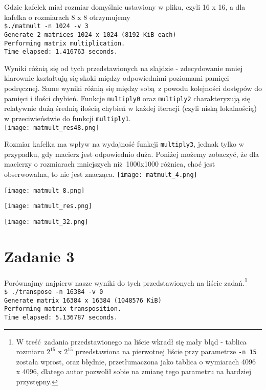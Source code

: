 \documentclass[10pt,wide]{mwart}
\begin{document}
Gdzie kafelek miał rozmiar domyślnie ustawiony w pliku, czyli 16 x 16, a dla kafelka o rozmiarach 8 x 8 otrzymujemy \\
\texttt{\$./matmult -n 1024 -v 3 \\
Generate 2 matrices 1024 x 1024 (8192 KiB each) \\
Performing matrix multiplication. \\
Time elapsed: 1.416763 seconds.\\}


  Wyniki różnią się od tych przedstawionych na slajdzie - zdecydowanie mniej klarownie kształtują się skoki między odpowiednimi poziomami pamięci podręcznej.
  Same wyniki różnią się między sobą z powodu kolejności dostępów do pamięci i ilości chybień.
  Funkcje \texttt{multiply0} oraz \texttt{multiply2} charakteryzują się relatywnie dużą średnią ilością chybień w każdej iteracji (czyli niską lokalnością) w przeciwieństwie do funkcji \texttt{multiply1}. \\
 \texttt{[image: matmult\_res48.png]}

 Rozmiar kafelka ma wpływ na wydajność funkcji \texttt{multiply3}, jednak tylko w przypadku, gdy macierz jest odpowiednio duża.
 Poniżej możemy zobaczyć, że dla macierzy o rozmiarach mniejszych niż 1000x1000 różnica, choć jest obserwowalna, to nie jest znacząca.
 \texttt{[image: matmult\_4.png]}

 \texttt{[image: matmult\_8.png]}

 \texttt{[image: matmult\_res.png]}

 \texttt{[image: matmult\_32.png]}

 \section{Zadanie 3}
 Porównajmy najpierw nasze wyniki do tych przedstawionych na liście zadań.\footnote{W treść zadania przedstawionego na liście wkradł się mały błąd - tablica rozmiaru $2^{15}$ x $2^{15}$ przedstawiona na pierwotnej liście przy parametrze \texttt{-n 15} została wprost, oraz błędnie, przetłumaczona jako tablica o wymiarach 4096 x 4096, dlatego autor pozwolił sobie na zmianę tego parametru na bardziej przystępny.} \\
 \texttt{\$ ./transpose -n 16384 -v 0 \\
Generate matrix 16384 x 16384 (1048576 KiB) \\
Performing matrix transposition. \\
Time elapsed: 5.136787 seconds.\\}
\end{document}
